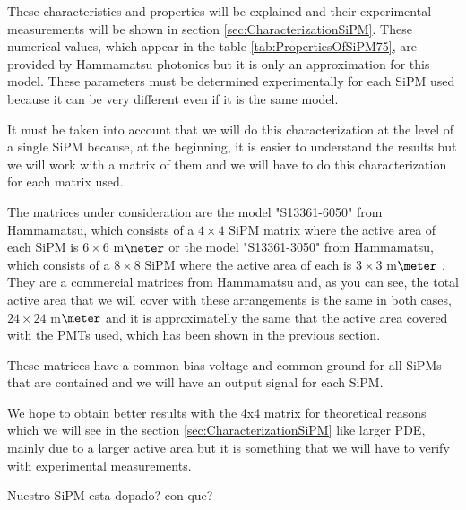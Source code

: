 These characteristics and properties will be explained and their experimental measurements will be shown in section \ref{sec:CharacterizationSiPM}. These numerical values, which appear in the table \ref{tab:PropertiesOfSiPM75}, are provided by Hammamatsu photonics but it is only an approximation for this model. These parameters must be determined experimentally for each SiPM used because it can be very different even if it is the same model.

It must be taken into account that we will do this characterization at the level of a single SiPM because, at the beginning, it is easier to understand the results but we will work with a matrix of them and we will have to do this characterization for each matrix used. 

The matrices under consideration are the model "S13361-6050" from Hammamatsu, which consists of a $4\times 4$ SiPM matrix where the active area of each SiPM is $6\times 6$ m$\meter$ \cite{DataSheetHammamatsu_array_SiPM_6050} or the model "S13361-3050" from Hammamatsu, which consists of a $8\times 8$ SiPM where the active area of each is $3\times 3$ m$\meter$ \cite{DataSheetHammamatsu_array_SiPM_3050}. They are a commercial matrices from Hammamatsu and, as you can see, the total active area that we will cover with these arrangements is the same in both cases, $24\times 24$ m$\meter$ and it is approximatelly the same that the active area covered with the PMTs used, which has been shown in the previous section.

These matrices have a common bias voltage and common ground for all SiPMs that are contained and we will have an output signal for each SiPM. 

We hope to obtain better results with the 4x4 matrix for theoretical reasons which we will see in the section \ref{sec:CharacterizationSiPM} like larger PDE, mainly due to a larger active area but it is something that we will have to verify with experimental measurements.




Nuestro SiPM esta dopado? con que?